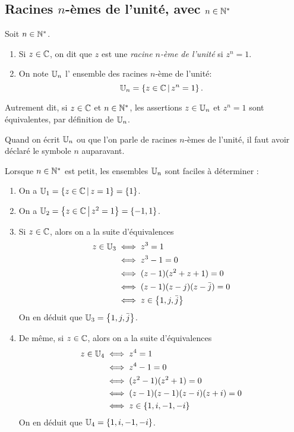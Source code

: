 \subsection{Racines $n$-èmes de l'unité, avec $n\in \mathbb{N}^*$}

\begin{definition}
Soit $n\in\mathbb{N}^*$.
\begin{enumerate}
\item Si $z\in \mathbb{C}$, on dit que $z$ est une \emph{racine $n$-ème de l'unité} si $z^n=1$.
\item On note $\mathbb{U}_n$ l' ensemble des racines $n$-ème de l'unité:
\[ \U_n=\ensemble{z\in\C}{z^n=1}.\]
\end{enumerate}
\end{definition}

Autrement dit, si $z\in \mathbb{C}$ et $n\in\mathbb{N}^*$, les assertions \og $z\in\mathbb{U}_n$\fg{} et \og$z^n=1$\fg{} sont équivalentes, par définition de $\mathbb{U}_n$. 

\begin{attention}
Quand on écrit \og $\mathbb{U}_n$\fg{} ou que l'on parle de racines $n$-èmes de l'unité, il faut avoir déclaré le symbole $n$ auparavant.
\end{attention}


\begin{exemples}
Lorsque $n\in \mathbb{N}^*$ est petit, les ensembles $\mathbb{U}_n$ sont faciles à déterminer :
\begin{enumerate}
\item On a $\U_1=\ensemble{z\in\C}{z=1}=\{1\}$.
\item On a $\U_2=\ensemble{z\in\C}{z^2=1}=\{-1,1\}$.
\item Si $z\in\mathbb{C}$, alors on a la suite d'équivalences
\begin{align*}
z\in\mathbb{U}_3 &\iff z^3=1 \\
&\iff z^3-1=0 \\
&\iff (z-1)(z^2+z+1)=0 \\
&\iff (z-1)(z-j)(z-\bar j)=0\\
&\iff z\in \left\{1,j,\bar j\right\}
\end{align*}
On en déduit que $\mathbb{U}_3 = \left\{1,j,\bar j\right\}$.
\item De même, si $z\in\mathbb{C}$, alors on a la suite d'équivalences
\begin{align*}
z\in\mathbb{U}_4 &\iff z^4=1 \\
&\iff z^4-1=0 \\
&\iff (z^2-1)(z^2+1)=0 \\
&\iff (z-1)(z-1)(z-i)(z+i)=0\\
&\iff z\in \left\{1,i,-1,-i\right\}
\end{align*}
On en déduit que $\mathbb{U}_4 = \left\{1,i,-1,-i\right\}$.
\end{enumerate}
\end{exemples}

